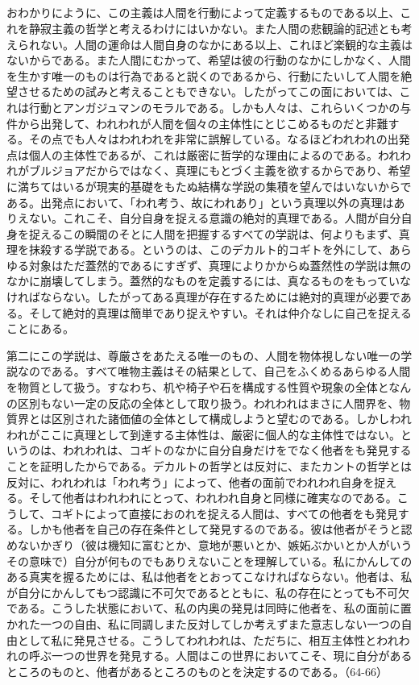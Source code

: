 \subsection{}


おわかりにように、この主義は人間を行動によって定義するものである以上、これを静寂主義の哲学と考えるわけにはいかない。また人間の悲観論的記述とも考えられない。人間の運命は人間自身のなかにある以上、これほど楽観的な主義はないからである。また人間にむかって、希望は彼の行動のなかにしかなく、人間を生かす唯一のものは行為であると説くのであるから、行動にたいして人間を絶望させるための試みと考えることもできない。したがってこの面においては、これは行動とアンガジュマンのモラルである。しかも人々は、これらいくつかの与件から出発して、われわれが人間を個々の主体性にとじこめるものだと非難する。その点でも人々はわれわれを非常に誤解している。なるほどわれわれの出発点は個人の主体性であるが、これは厳密に哲学的な理由によるのである。われわれがブルジョアだからではなく、真理にもとづく主義を欲するからであり、希望に満ちてはいるが現実的基礎をもたぬ結構な学説の集積を望んではいないからである。出発点において、「われ考う、故にわれあり」という真理以外の真理はありえない。これこそ、自分自身を捉える意識の絶対的真理である。人間が自分自身を捉えるこの瞬間のそとに人間を把握するすべての学説は、何よりもまず、真理を抹殺する学説である。というのは、このデカルト的コギトを外にして、あらゆる対象はただ蓋然的であるにすぎず、真理によりかからぬ蓋然性の学説は無のなかに崩壊してしまう。蓋然的なものを定義するには、真なるものをもっていなければならない。したがってある真理が存在するためには絶対的真理が必要である。そして絶対的真理は簡単であり捉えやすい。それは仲介なしに自己を捉えることにある。

第二にこの学説は、尊厳さをあたえる唯一のもの、人間を物体視しない唯一の学説なのである。すべて唯物主義はその結果として、自己をふくめるあらゆる人間を物質として扱う。すなわち、机や椅子や石を構成する性質や現象の全体となんの区別もない一定の反応の全体として取り扱う。われわれはまさに人間界を、物質界とは区別された諸価値の全体として構成しようと望むのである。しかしわれわれがここに真理として到達する主体性は、厳密に個人的な主体性ではない。というのは、われわれは、コギトのなかに自分自身だけをでなく他者をも発見することを証明したからである。デカルトの哲学とは反対に、またカントの哲学とは反対に、われわれは「われ考う」によって、他者の面前でわれわれ自身を捉える。そして他者はわれわれにとって、われわれ自身と同様に確実なのである。こうして、コギトによって直接におのれを捉える人間は、すべての他者をも発見する。しかも他者を自己の存在条件として発見するのである。彼は他者がそうと認めないかぎり（彼は機知に富むとか、意地が悪いとか、嫉妬ぶかいとか人がいうその意味で）自分が何ものでもありえないことを理解している。私にかんしてのある真実を握るためには、私は他者をとおってこなければならない。他者は、私が自分にかんしてもつ認識に不可欠であるとともに、私の存在にとっても不可欠である。こうした状態において、私の内奥の発見は同時に他者を、私の面前に置かれた一つの自由、私に同調しまた反対してしか考えずまた意志しない一つの自由として私に発見させる。こうしてわれわれは、ただちに、相互主体性とわれわれの呼ぶ一つの世界を発見する。人間はこの世界においてこそ、現に自分があるところのものと、他者があるところのものとを決定するのである。（64-66）


